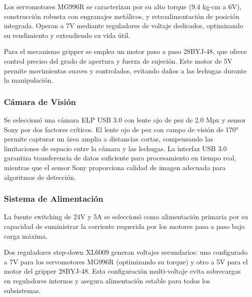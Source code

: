 Los servomotores MG996R se caracterizan por su alto torque (9.4 kg-cm a 6V), construcción robusta con engranajes metálicos, y retroalimentación de posición integrada. Operan a 7V mediante reguladores de voltaje dedicados, optimizando su rendimiento y extendiendo su vida útil.

Para el mecanismo gripper se emplea un motor paso a paso 28BYJ-48, que ofrece control preciso del grado de apertura y fuerza de sujeción. Este motor de 5V permite movimientos suaves y controlados, evitando daños a las lechugas durante la manipulación.

\subsubsection{Cámara de Visión}

Se seleccionó una cámara ELP USB 3.0 con lente ojo de pez de 2.0 Mpx y sensor Sony por dos factores críticos. El lente ojo de pez con campo de visión de 170° permite capturar un área amplia a distancias cortas, compensando las limitaciones de espacio entre la cámara y las lechugas. La interfaz USB 3.0 garantiza transferencia de datos suficiente para procesamiento en tiempo real, mientras que el sensor Sony proporciona calidad de imagen adecuada para algoritmos de detección.

\subsubsection{Sistema de Alimentación}

La fuente switching de 24V y 5A se seleccionó como alimentación primaria por su capacidad de suministrar la corriente requerida por los motores paso a paso bajo carga máxima.

Dos reguladores step-down XL6009 generan voltajes secundarios: uno configurado a 7V para los servomotores MG996R (optimizando su torque) y otro a 5V para el motor del gripper 28BYJ-48. Esta configuración multi-voltaje evita sobrecargas en reguladores internos y asegura alimentación estable para todos los subsistemas.